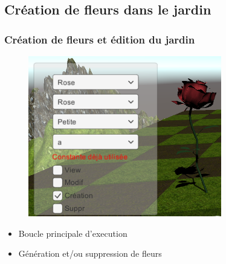 \documentclass{beamer}
\begin{document}
\subsection{Création de fleurs dans le jardin}
\begin{frame}
\frametitle{Création de fleurs et édition du jardin}
\begin{center}
\begin{figure}[!h]
\includegraphics[scale=0.55]{creationFleur.png}
\end{figure}
\end{center}
\begin{itemize}
\setlength\itemsep{0.5cm}
\item Boucle principale d'execution
\item Génération et/ou suppression de fleurs
\end{itemize}
\end{frame}

\end{document}
